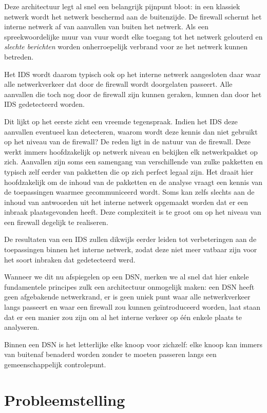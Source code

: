 Deze architectuur legt al snel een belangrijk pijnpunt bloot: in een klassiek
netwerk wordt het netwerk beschermd aan de buitenzijde. De firewall schermt het
interne netwerk af van aanvallen van buiten het netwerk. Als een
spreekwoordelijke muur van vuur wordt elke toegang tot het netwerk gelouterd en
\emph{slechte berichten} worden onherroepelijk verbrand voor ze het netwerk
kunnen betreden.

Het IDS wordt daarom typisch ook op het interne netwerk aangesloten daar waar
alle netwerkverkeer dat door de firewall wordt doorgelaten passeert. Alle
aanvallen die toch nog door de firewall zijn kunnen geraken, kunnen dan door
het IDS gedetecteerd worden.

Dit lijkt op het eerste zicht een vreemde tegenspraak. Indien het IDS deze
aanvallen eventueel kan detecteren, waarom wordt deze kennis dan niet gebruikt
op het niveau van de firewall? De reden ligt in de natuur van de firewall. Deze
werkt immers hoofdzakelijk op netwerk niveau en bekijken elk netwerkpakket op
zich. Aanvallen zijn soms een samengang van verschillende van zulke pakketten
en typisch zelf eerder van pakketten die op zich perfect legaal zijn. Het
draait hier hoofdzakelijk om de inhoud van de pakketten en de analyse vraagt
een kennis van de toepassingen waarmee gecommuniceerd wordt. Soms kan zelfs
slechts aan de inhoud van antwoorden uit het interne netwerk opgemaakt worden
dat er een inbraak plaatsgevonden heeft. Deze complexiteit is te groot om op
het niveau van een firewall degelijk te realiseren.

De resultaten van een IDS zullen dikwijls eerder leiden tot verbeteringen aan
de toepassingen binnen het interne netwerk, zodat deze niet meer vatbaar zijn
voor het soort inbraken dat gedetecteerd werd.

Wanneer we dit nu afspiegelen op een DSN, merken we al snel dat hier enkele
fundamentele principes zulk een architectuur onmogelijk maken: een DSN heeft
geen afgebakende netwerkrand, er is geen uniek punt waar alle netwerkverkeer
langs passeert en waar een firewall zou kunnen ge\"introduceerd worden, laat
staan dat er een manier zou zijn om al het interne verkeer op \'e\'en enkele
plaats te analyseren.

Binnen een DSN is het letterlijke elke knoop voor zichzelf: elke knoop kan
immers van buitenaf benaderd worden zonder te moeten passeren langs een
gemeenschappelijk controlepunt.

\section{Probleemstelling}
\label{section:probleem}

